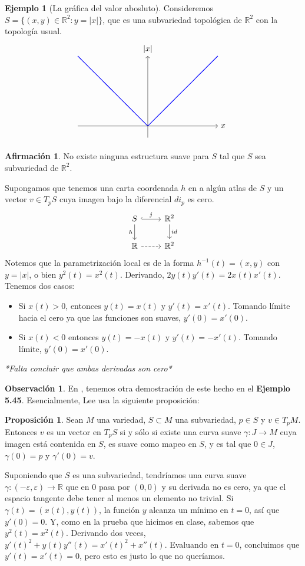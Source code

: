 \documentclass[spanish]{book}
\theoremstyle{definition}
\newtheorem*{prop}{Proposición}
\newtheorem*{obs}{Observación}
\newtheorem*{af}{Afirmación}
\newtheorem*{ejem}{Ejemplo}
\newcommand{\R}{\mathbb{R}}
\begin{document}
	\begin{ejem}[La gráfica del valor abosluto]
		Consideremos $S=\{(x,y)\in\R^2:y=|x|\}$, que es una subvariedad topológica de $\R^2$ con la topología usual.
		\[\begin{tikzpicture}
			\draw[->] (-3,0) -- (3,0) node[right] {$x$};
			\draw[->] (0,-.5) -- (0,3) node[above] {$|x|$};
			
			\draw[blue, thick, domain=-3:3, samples=100] plot (\x, {abs(\x)});
		\end{tikzpicture}\]
		\begin{af}
			No existe ninguna estructura suave para $S$ tal que $S$ sea subvariedad de $\R^2$.
		\end{af}
		Supongamos que tenemos una carta coordenada $h$ en a algún atlas de $S$ y un vector $v\in T_pS$ cuya imagen bajo la diferencial $di_p$ es cero.
		\[\begin{tikzcd}
			S\arrow[hook]{r}{j}\arrow[swap]{d}{h}&\R^2\arrow{d}{id}\\
			\R\arrow[dashed]{r}&\R^2
		\end{tikzcd}\]		
		Notemos que la parametrización local es de la forma $h^{-1}(t)=(x,y)$ con $y=|x|$, o bien $y^2(t)=x^2(t)$. Derivando, $2y(t)y'(t)=2x(t)x'(t)$. Tenemos dos casos:
		\begin{itemize}
			\item Si $x(t)>0$, entonces $y(t)=x(t)$ y $y'(t)=x'(t)$. Tomando límite hacia el cero ya que las funciones son suaves, $y'(0)=x'(0)$.
			\item Si $x(t)<0$ entonces $y(t)=-x(t)$ y $y'(t)=-x'(t)$. Tomando límite, $y'(0)=x'(0)$.
		\end{itemize}
		\textit{*Falta concluir que ambas derivadas son cero*}
	\end{ejem} 
	\begin{obs}
		En \cite{Lee}, tenemos otra demostración de este hecho en el \textbf{Ejemplo 5.45}. Esencialmente, Lee usa la siguiente proposición:
		\begin{prop}
			Sean $M$ una variedad, $S\subset M$ una subvariedad, $p\in S$ y $v\in T_pM$. Entonces $v$ es un vector en $T_pS$ si y sólo si existe una curva suave $\gamma:J\to M$ cuya imagen está contenida en $S$, es suave como mapeo en $S$, y es tal que $0\in J$, $\gamma(0)=p$ y $\gamma'(0)=v$.
		\end{prop}
		Suponiendo que $S$ es una subvariedad, tendríamos una curva suave $\gamma:(-\varepsilon,\varepsilon)\to\R$ que en $0$ pasa por $(0,0)$ y su derivada no es cero, ya que el espacio tangente debe tener al menos un elemento no trivial. Si $\gamma(t)=(x(t),y(t))$, la función $y$ alcanza un mínimo en $t=0$, así que $y'(0)=0$. Y, como en la prueba que hicimos en clase, sabemos que $y^2(t)=x^2(t)$. Derivando dos veces, $y'(t)^2+y(t)y''(t)=x'(t)^2+x''(t)$. Evaluando en $t=0$, concluimos que $y'(t)=x'(t)=0$, pero esto es justo lo que no queríamos.
	\end{obs}
	
\end{document}
